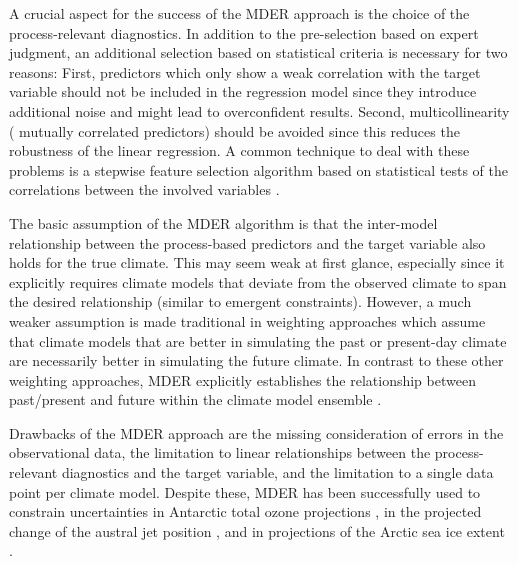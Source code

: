 A crucial aspect for the success of the \ac{MDER} approach is the choice of the
process-relevant diagnostics. In addition to the pre-selection based on expert
judgment, an additional selection based on statistical criteria is necessary
for two reasons: First, predictors which only show a weak correlation with the
target variable should not be included in the regression model since they
introduce additional noise and might lead to overconfident results. Second,
multicollinearity (\ie{} mutually correlated predictors) should be avoided
since this reduces the robustness of the linear regression. A common technique
to deal with these problems is a stepwise feature selection algorithm based on
statistical tests of the correlations between the involved variables
\autocite{Karpechko2013}.

The basic assumption of the \ac{MDER} algorithm is that the inter-model
relationship between the process-based predictors and the target variable also
holds for the true climate. This may seem weak at first glance, especially
since it explicitly requires climate models that deviate from the observed
climate to span the desired relationship (similar to emergent constraints).
However, a much weaker assumption is made traditional in weighting approaches
which assume that climate models that are better in simulating the past or
present-day climate are necessarily better in simulating the future climate. In
contrast to these other weighting approaches, \ac{MDER} explicitly establishes
the relationship between past/present and future within the climate model
ensemble \autocite{Karpechko2013}.

Drawbacks of the \ac{MDER} approach are the missing consideration of errors in
the observational data, the limitation to linear relationships between the
process-relevant diagnostics and the target variable, and the limitation to a
single data point per climate model. Despite these, \ac{MDER} has been
successfully used to constrain uncertainties in Antarctic total ozone
projections \autocite{Karpechko2013}, in the projected change of the austral
jet position \autocite{Wenzel2016a}, and in projections of the Arctic sea ice
extent \autocite{Senftleben2020}.
